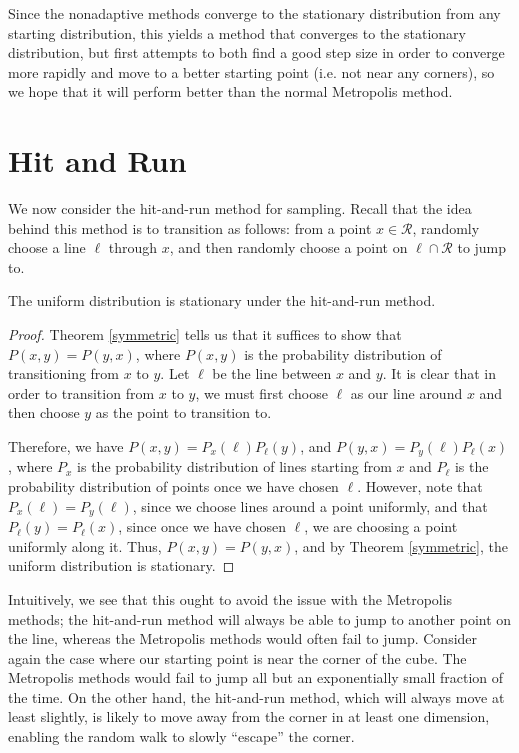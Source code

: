 \documentclass[11pt]{article}
\begin{document}
Since the nonadaptive methods converge to the stationary distribution from any starting distribution, this yields a method that converges to the stationary distribution, but first attempts to both find a good step size in order to converge more rapidly and move to a better starting point (i.e. not near any corners), so we hope that it will perform better than the normal Metropolis method.

\section{Hit and Run}

We now consider the hit-and-run method for sampling. Recall that the idea behind this method is to transition as follows: from a point $x \in \mathcal{R}$, randomly choose a line $\ell$ through $x$, and then randomly choose a point on $\ell \cap \mathcal{R}$ to jump to.

\begin{prop}
The uniform distribution is stationary under the hit-and-run method.
\end{prop}
\begin{proof}
Theorem \ref{symmetric} tells us that it suffices to show that $P(x,y) = P(y,x)$, where $P(x,y)$ is the probability distribution of transitioning from $x$ to $y$. Let $\ell$ be the line between $x$ and $y$. It is clear that in order to transition from $x$ to $y$, we must first choose $\ell$ as our line around $x$ and then choose $y$ as the point to transition to. 

Therefore, we have $P(x,y) = P_x(\ell)P_\ell(y)$, and $P(y,x) = P_y(\ell)P_\ell(x)$, where $P_x$ is the probability distribution of lines starting from $x$ and $P_\ell$ is the probability distribution of points once we have chosen $\ell$. However, note that $P_x(\ell) = P_y(\ell)$, since we choose lines around a point uniformly, and that $P_\ell(y) = P_\ell(x)$, since once we have chosen $\ell$, we are choosing a point uniformly along it. Thus, $P(x,y) = P(y,x)$, and by Theorem \ref{symmetric}, the uniform distribution is stationary.
\end{proof}

Intuitively, we see that this ought to avoid the issue with the Metropolis methods; the hit-and-run method will always be able to jump to another point on the line, whereas the Metropolis methods would often fail to jump. Consider again the case where our starting point is near the corner of the cube. The Metropolis methods would fail to jump all but an exponentially small fraction of the time. On the other hand, the hit-and-run method, which will always move at least slightly, is likely to move away from the corner in at least one dimension, enabling the random walk to slowly ``escape'' the corner.
\end{document}
